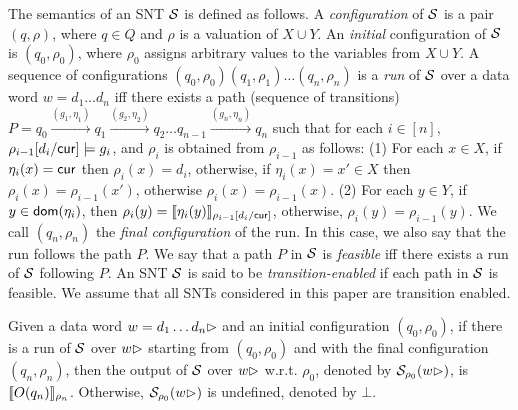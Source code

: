 The semantics of an SNT ${\mathcal{S} }$  is defined as follows. A \emph{configuration} of ${\mathcal{S} }$ is a pair $(q,\rho)$, where $q \in Q$ and $\rho$ is a valuation of $X \cup Y$. An \emph{initial} configuration of ${\mathcal{S} }$ is $(q_0,\rho_0)$, where $\rho_0$ assigns arbitrary values to the variables from $X\cup Y$.
A sequence of configurations $(q_0,\rho_0)(q_1,\rho_1)\ldots(q_n,\rho_n)$ is
a \emph{run} of ${\mathcal{S} }$ over a data word $w=d_1 \dots d_n$ iff there exists a path (sequence of transitions) $P=q_0 \xrightarrow{(g_1,\eta_1)} q_1 \xrightarrow{(g_2,\eta_2)} q_2 \dots q_{n-1} \xrightarrow{(g_n, \eta_n)} q_n$ such that for each $i \in [n]$, $\rho_{i-1}[d_i/\mathsf{cur}] \models g_i$, and $\rho_i$ is obtained from $\rho_{i-1}$ as follows: (1) For each $x \in X$, if $\eta_i(x)=\mathsf{cur}$ then $\rho_i(x)=d_i$, otherwise, if $\eta_i(x)=x' \in X$ then $\rho_i(x)=\rho_{i-1}(x')$, otherwise $\rho_i(x)=\rho_{i-1}(x)$. (2) For each $y \in Y$, if $y \in \mathsf{dom}(\eta_i)$, then $\rho_i(y)=\llbracket\eta_i(y)\rrbracket_{\rho_{i-1}[d_i/\mathsf{cur}]}$, otherwise, $\rho_i(y)=\rho_{i-1}(y)$.
We call $(q_n,\rho_n)$ the \emph{final configuration} of the run. In this case, we also say that the run follows the path $P$.
We say that a path $P$ in ${\mathcal{S} }$ is \emph{feasible} iff there exists a run of ${\mathcal{S} }$ following $P$. 
An SNT ${\mathcal{S} }$ is said to be \emph{transition-enabled} if each path in ${\mathcal{S} }$ is feasible. We assume that all SNTs considered in this paper are transition enabled.


Given a data word $w = d_1 \dots d_n\rhd$ and an initial configuration $(q_0, \rho_0)$, if there is a run of ${\mathcal{S} }$ over $w\rhd$ starting from $(q_0,\rho_0)$ and with the final configuration $(q_n,\rho_n)$, then the output of ${\mathcal{S} }$ over $w\rhd$ w.r.t. $\rho_0$, denoted by ${{\mathcal{S} }}_{\rho_0}(w\rhd)$, is $\llbracket O(q_n)\rrbracket_{\rho_n}$. Otherwise, ${{\mathcal{S} }}_{\rho_0}(w\rhd)$ is undefined, denoted by $\bot$. 


